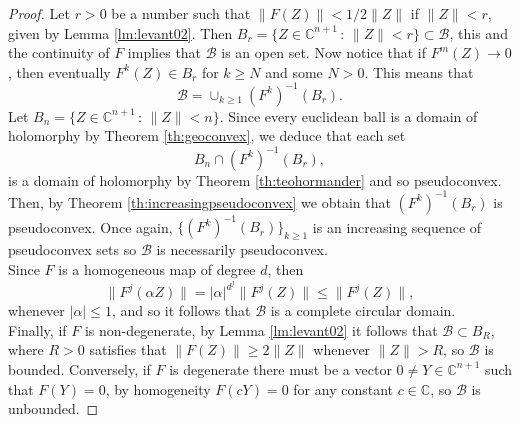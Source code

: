 \begin{proof}
Let $r>0$ be a number such that $\|F(Z)\| <1/2 \|Z\|$ if $\|Z\|<r$, given by Lemma \ref{lm:levant02}. Then $B_r = \{Z\in \mathbb{C}^{n+1} \, : \, \|Z\|<r\} \subset \mathcal{B}$, this and the continuity of $F$ implies that $\mathcal{B}$ is an open set. Now notice that if $F^m(Z) \rightarrow 0$, then eventually 
$ F^k(Z) \in B_r$ for $k\geq N$ and some $N>0$. This means that
$$\mathcal{B} = \cup_{k\geq 1} (F^{k})^{-1}(B_r).$$ 
Let $B_n = \{Z\in \mathbb{C}^{n+1} \, : \, \|Z\|<n\}$. Since every euclidean ball is a domain of holomorphy by Theorem \ref{th:geoconvex}, we deduce that each set
$$B_n \cap (F^k)^{-1}(B_r),$$
is a domain of holomorphy by Theorem \ref{th:teohormander} and so pseudoconvex. Then, by Theorem \ref{th:increasingpseudoconvex} we obtain that $(F^{k})^{-1}(B_r)$ is pseudoconvex. Once again, $\{(F^{k})^{-1}(B_r)\}_{k\geq 1}$ is an increasing sequence of pseudoconvex sets so $\mathcal{B}$ is necessarily pseudoconvex.\\

Since $F$ is a homogeneous map of degree $d$, then
$$\|F^j(\alpha Z)\| = |\alpha|^{d^j} \|F^j(Z)\| \leq \|F^j(Z)\|,$$
whenever $|\alpha| \leq 1$, and so it follows that $\mathcal{B}$ is a complete circular domain.\\

Finally, if $F$ is non-degenerate, by Lemma \ref{lm:levant02} it follows that $\mathcal{B} \subset B_R$, where $R>0$ satisfies that $\|F(Z)\| \geq 2 \|Z\|$ whenever $\|Z\|>R$, so $\mathcal{B}$ is bounded. Conversely, if $F$ is degenerate there must be a vector $0\neq Y\in \mathbb{C}^{n+1}$ such that $F(Y)=0$, by homogeneity $F(cY)=0$ for any constant $c\in \mathbb{C}$, so $\mathcal{B}$ is unbounded.
\end{proof}

